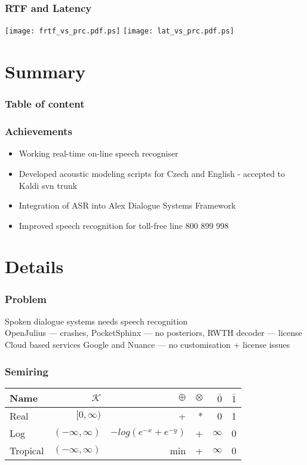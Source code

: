\begin{frame}\frametitle{RTF and Latency} 
    \texttt{[image: frtf\_vs\_prc.pdf.ps]}
    \texttt{[image: lat\_vs\_prc.pdf.ps]}
\end{frame}


\section{Summary} %

\begin{frame} \frametitle{Table of content} \tableofcontents \end{frame}

\begin{frame}\frametitle{Achievements} 
    \begin{itemize}
        \item Working real-time on-line speech recogniser
        \item Developed acoustic modeling scripts for Czech and English - accepted to Kaldi svn trunk
        \item Integration of ASR into Alex Dialogue Systems Framework
        \item Improved speech recognition for toll-free line 800 899 998
    \end{itemize}
\end{frame}


\section{Details} %


\begin{frame}\frametitle{Problem} 
    Spoken dialogue systems needs speech recognition \\
    OpenJulius --- crashes, PocketSphinx --- no posteriors, RWTH decoder --- license \\
    Cloud based services Google and Nuance --- no customisation + license issues
\end{frame}

\begin{frame} \frametitle{Semiring}
\begin{tabular}{lrrrrr}
\hline
Name & $\mathcal{K}$ & $\oplus$ & $ \otimes$ & $\bar{0}$ & $\bar{1}$ \\ 
\hline
Real        & $[0,\infty)$        &  +                     &  * &  0        &  1  \\
Log         & $(-\infty, \infty)$ & $-log(e^{-x} + e^{-y})$ & + &  $\infty$ &  0  \\
Tropical    & $(-\infty, \infty)$ &  min                   &  + &  $\infty$ &  0  \\
\hline
\end{tabular}
\end{frame}

